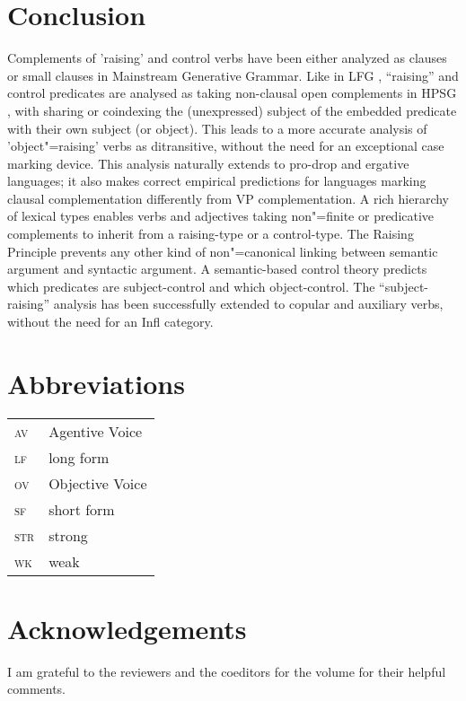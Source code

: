 \documentclass[output=paper
	        ,collection
	        ,collectionchapter
 	        ,biblatex
                ,babelshorthands
                ,newtxmath
                ,draftmode
                ,colorlinks, citecolor=brown
]{langscibook}
\begin{document}
	
\section{Conclusion}
Complements of 'raising' and control verbs have been either analyzed as clauses \citep{Chomsky81a} or small clauses \citep{Stowell81a-u,Stowell1983} in Mainstream Generative Grammar.
Like in LFG \citep{Bresnan82c}, ``raising'' and control predicates are analysed as taking non-clausal open complements in HPSG \citep{PollardandSag1994}, with sharing or coindexing the (unexpressed) subject of the embedded predicate with their own subject (or object). This leads to a more accurate analysis of 'object"=raising' verbs as ditransitive, without the need for an exceptional case marking device. This analysis naturally extends to pro-drop and ergative languages; it also makes correct empirical predictions for languages marking clausal complementation differently from VP complementation. A rich hierarchy of lexical types enables verbs and adjectives taking non"=finite or predicative complements to inherit from a raising-type or a control-type. The Raising Principle prevents any other kind of non"=canonical linking between semantic argument and syntactic argument. A semantic-based control theory predicts which predicates are subject-control and which object-control. The ``subject-raising'' analysis has been successfully extended to copular and auxiliary verbs, without the need for an Infl category.




\section*{Abbreviations}

\begin{tabularx}{.45\textwidth}{lX}
\textsc{av} & Agentive Voice\\
\textsc{lf} & long form\\ 
\textsc{ov} & Objective Voice\\
\textsc{sf} & short form\\
\textsc{str} & strong\\
\textsc{wk} & weak\\

\end{tabularx}

\section*{Acknowledgements}

I am grateful to the reviewers and the coeditors for the volume for their helpful comments.
{\sloppy
\printbibliography[heading=subbibliography,notkeyword=this] 
}
\end{document}
